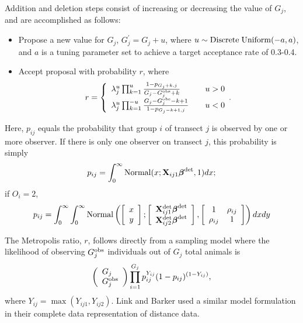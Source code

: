 \documentclass[10pt]{article}
\begin{document}
Addition and deletion steps consist of increasing or decreasing the value of $G_j$, and are accomplished as follows:
\begin{itemize}
    \item Propose a new value for $G_j$, $G_j^\prime=G_j+u$, where
    $u\sim {\rm Discrete \hspace{1mm} Uniform}(-a,a)$, and $a$ is a tuning parameter set to achieve a target acceptance rate of 0.3-0.4.
    \item Accept proposal with probability $r$, where
    $$
    r= \left\{ \begin{array}{lll}
				\lambda_j^u \prod_{k=1}^u
                \frac{1-p_{G_j+k,j}}{G_j-G_j^{\rm obs}+k}& & u>0\\
			    \lambda_j^u \prod_{k=1}^{-u}
                \frac{G_j-G_j^{\rm obs}-k+1}{
                1-p_{G_j-k+1,j}}& & u<0
		\end{array}. \right.
    $$
\end{itemize}
    Here, $p_{ij}$ equals the probability that group $i$ of transect $j$ is observed by one or more observer.  If there is only one observer on transect $j$, this probability is simply $$
      p_{ij} = \int_0^\infty {\rm Normal}(x;{\bf X}_{ij1}\boldsymbol{\beta}^{\rm det},1)dx;
    $$
    if $O_i=2$,
    $$
      p_{ij} = \int_0^\infty \int_0^\infty {\rm Normal}
        \left( \left[ \begin{array}{c}
				x\\
				y
		\end{array} \right]; \left[
        \begin{array}{c}
				{\bf X}_{ij1}^{\rm det} \boldsymbol{\beta}^{\rm
                det}\\
				{\bf X}_{ij2}^{\rm det} \boldsymbol{\beta}^{\rm
                det}
		\end{array}\right],
        \left[ \begin{array}{cc}
            1 & \rho_{ij} \\
            \rho_{ij} & 1
        \end{array} \right]
        \right) dx dy
    $$

The Metropolis ratio, $r$, follows directly from a sampling model where the likelihood of observing $G_j^{\rm obs}$ individuals out of $G_j$ total animals is
$$
\left( \begin{array}{l}
G_j \\
G_j^{\rm obs}
\end{array} \right)
\prod_{i=1}^{G_j} p_{ij}^{Y_{ij}} (1-p_{ij})^{(1-Y_{ij})},
$$
where $Y_{ij}=\max(Y_{ij1},Y_{ij2})$.  Link and Barker \cite{LinkBarker2010} used a similar model formulation in their complete data representation of distance data.
\end{document}
